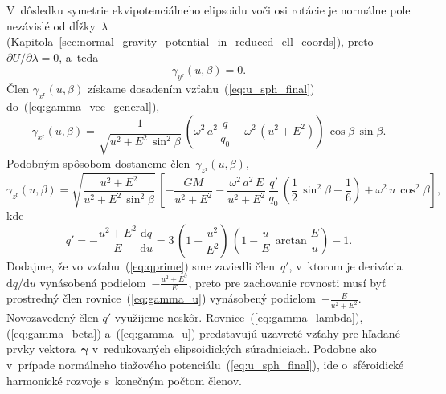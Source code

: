 \documentclass[a4paper, 12pt]{book}
\newcommand{\diff}{\mathrm d}
\begin{document}
V~dôsledku symetrie ekvipotenciálneho elipsoidu voči osi rotácie je normálne 
pole nezávislé od dĺžky~$\lambda$ 
(Kapitola~\ref{sec:normal_gravity_potential_in_reduced_ell_coords}), 
preto~$\partial U \slash \partial \lambda = 0$, a~teda
%
\begin{equation}
\label{eq:gamma_lambda}
\gamma_{y^\mathrm{r}}(u, \beta) = 0{.}
\end{equation}
%
Člen $\gamma_{x^\mathrm{r}}(u, \beta)$ získame dosadením 
vzťahu~(\ref{eq:u_sph_final}) do~(\ref{eq:gamma_vec_general}),
%
\begin{equation}
\label{eq:gamma_beta}
\gamma_{x^\mathrm{r}}(u, \beta) = \frac{1}{\sqrt{u^2 + E^2 \, \sin^2\beta}} \, 
\left( \omega^2 \, a^2 \, \frac{q}{q_0} - \omega^2 \, (u^2 + E^2) \right) \, 
\cos\beta \, \sin\beta{.}
\end{equation}
%
Podobným spôsobom dostaneme člen~$\gamma_{z^\mathrm{r}}(u, \beta)$,
%
\begin{equation}
\label{eq:gamma_u}
\gamma_{z^\mathrm{r}}(u, \beta) = \sqrt{\dfrac{u^2 + E^2}{u^2 + E^2 \, 
\sin^2\beta}} \, \left[ -\frac{GM}{u^2 + E^2} - \frac{\omega^2 \, a^2 \, E}{u^2 
+ E^2} \, \frac{q'}{q_0} \, \left( \frac{1}{2} \, \sin^2\beta - \frac{1}{6} 
\right) + \omega^2 \, u \, \cos^2\beta \right]{,}
\end{equation}
%
kde \parencite{MoritzPhysicalGeodesy}
%
\begin{equation}
\label{eq:qprime}
q' = -\frac{u^2 + E^2}{E} \, \frac{\diff q}{\diff u} = 3 \, \left( 
1 + \frac{u^2}{E^2} \right) \, \left(  1 - \frac{u}{E} \, \arctan\frac{E}{u} 
\right) - 1{.}
\end{equation}
%
Dodajme, že vo vzťahu~(\ref{eq:qprime}) sme zaviedli člen~$q'$, v~ktorom je 
derivácia~$\diff q \slash \diff u$ vynásobená podielom~$-\frac{u^2 + E^2}{E}$, 
preto pre zachovanie rovnosti musí byť prostredný člen 
rovnice~(\ref{eq:gamma_u}) vynásobený podielom~$-\frac{E}{u^2 + E^2}$.  
Novozavedený člen $q'$ využijeme neskôr.  Rovnice~(\ref{eq:gamma_lambda}), 
(\ref{eq:gamma_beta}) a~(\ref{eq:gamma_u}) predstavujú uzavreté vzťahy pre 
hľadané prvky vektora~$\boldsymbol \gamma$ v~redukovaných elipsoidických 
súradniciach.  Podobne ako v~prípade normálneho tiažového 
potenciálu~(\ref{eq:u_sph_final}), ide o~sféroidické harmonické rozvoje 
s~konečným počtom členov.
\end{document}
